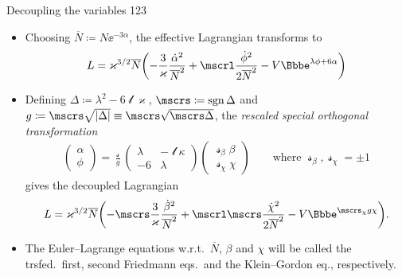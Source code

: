 \documentclass[9pt]{beamer}
\begin{document}
\begin{frame}%
{Decoupling the variables}%
{123}
\begin{itemize}
\item Choosing $\overline{N} \coloneqq N\ee^{-3\alpha}$, the effective
Lagrangian transforms to
\begin{align}
L = \varkappa^{3/2}\overline{N}
\rbr{-\frac{3}{\varkappa}\frac{\dot{\alpha}^2}{\overline{N}^2}
+\mscrl\frac{\dot{\phi}^2}{2\overline{N}^2} - V\ee^{\lambda\phi+6\alpha}}
\end{align}

\item Defining $\Delta \coloneqq \lambda^2 - 6\mscrl\varkappa$,
$\mscrs \coloneqq \sgn \Delta$ and
$g \coloneqq \mscrs \sqrt{\vbr{\Delta}} \equiv \mscrs\sqrt{\mscrs\Delta}$,
the \emph{rescaled special orthogonal transformation}
\begin{align}
\begin{pmatrix}
\alpha \\ \phi
\end{pmatrix} = \frac{\mscrs}{g}
\begin{pmatrix}
\lambda & -\mscrl\kappa \\
-6 & \lambda
\end{pmatrix}
\begin{pmatrix}
\mscrs_\beta \beta \\ \mscrs_\chi \chi
\end{pmatrix}\qquad\text{where } \mscrs_\beta, \mscrs_\chi = \pm 1
\end{align}
gives the decoupled Lagrangian
\begin{align}
L = \varkappa^{3/2}\overline{N}
\rbr{-\mscrs\frac{3}{\varkappa}\frac{\dot{\beta}^2}{\overline{N}^2}
+\mscrl\mscrs\frac{\dot{\chi}^2}{2\overline{N}^2}
-V\ee^{\mscrs_\chi g\chi}}.
\label{eq:lagrangian-decoupled}
\end{align}

\item
The Euler--Lagrange equations w.r.t.\ $\overline{N}$, $\beta$ and
$\chi$ will be called the trsfed.\ first, second Friedmann eqs.\ and the
Klein--Gordon eq., respectively.
\end{itemize}
\end{frame}
\end{document}
